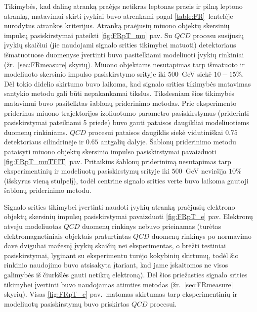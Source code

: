 \documentclass[a4paper, 12pt, oneside]{article}
\newcommand{\QCD}{QC\! D}
\begin{document}
Tikimybės, kad dalinę atranką praėjęs netikras leptonas praeis ir pilną leptono atranką, matavimui skirti įvykiai buvo
atrenkami pagal \ref{table:FR}~lentelėje nurodytus atrankos kriterijus.
Atranką praėjusių miuono objektų skersinių impulsų pasiskirstymai pateikti \ref{fig:FRpT_mu} pav.
Su $\QCD$ procesu susijusių įvykių skaičiui (jie naudojami signalo srities tikimybei matuoti) detektoriaus išmatuotuose
duomenyse įvertinti buvo pasitelkiami modeliuoti įvykių rinkiniai (žr.\ \ref{sec:FRmeasure} skyrių).
Miuono objektams nesutapimas tarp išmatuoto ir modeliuoto skersinio impulso pasiskirstymo srityje iki $500$~GeV siekė $10-15\%$.
Dėl tokio didelio skirtumo buvo laikoma, kad signalo srities tikimybės matavimas santykio metodu gali būti nepakankamai tikslus.
Tikslesniam šios tikimybės matavimui buvo pasitelktas šablonų priderinimo metodas.
Prie eksperimento priderinus miuono trajektorijos izoliuotumo parametro pasiskirstymus (priderinti pasiskirstymai pateikiami 5 priede)
buvo gauti pataisos daugikliai modeliuotiems duomenų rinkiniams.
$\QCD$ procesui pataisos daugiklis siekė vidutiniškai $0.75$ detektoriaus cilindrinėje ir $0.65$ antgalių dalyje.
Šablonų priderinimo metodu pataisyti miuono objektų skersinio impulso pasiskirstymai pavaizduoti \ref{fig:FRpT_muTFIT} pav.
Pritaikius šablonų priderinimą nesutapimas tarp eksperimentinių ir modeliuotų pasiskirstymų srityje iki $500$~GeV neviršija $10\%$
(išskyrus vieną stulpelį), todėl centrine signalo srities verte buvo laikoma gautoji šablonų priderinimo metodu.

Signalo srities tikimybei įvertinti naudoti įvykių atranką praėjusių elektrono objektų skersinių impulsų pasiskirstymai
pavaizduoti \ref{fig:FRpT_e} pav.
Elektronų atveju modeliuotas $\QCD$ duomenų rinkinys nebuvo prieinamas (turėtas elektromagnetiniais objektais praturtintas
$\QCD$ duomenų rinkinys po normavimo davė dvigubai mažesnį įvykių skaičių nei eksperimentas, o brėžti testiniai pasiskirstymai,
lyginant su eksperimentu turėjo kokybinių skirtumų, todėl šio rinkinio naudojimo buvo atsisakyta įtariant, kad jame įskaitomos
ne visos galimybės iš čiurkšlės gauti netikrą elektroną).
Dėl šios priežasties signalo srities tikimybei įvertinti buvo naudojamas atimties metodas (žr.\ \ref{sec:FRmeasure} skyrių).
Visas \ref{fig:FRpT_e} pav.\ matomas skirtumas tarp eksperimentinių ir modeliuotų pasiskirstymų buvo priskirtas $\QCD$ procesui.
\end{document}
